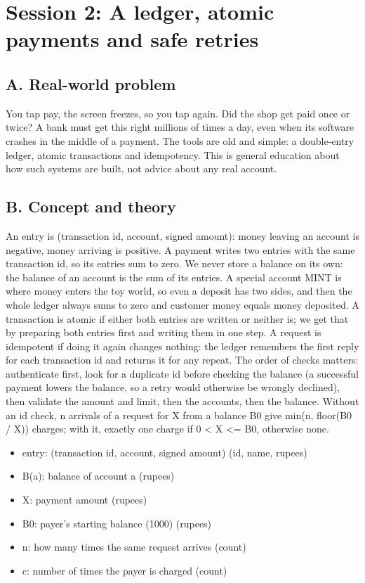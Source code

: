 \documentclass[11pt,a4paper]{article}
\begin{document}
\section{Session 2: A ledger, atomic payments and safe retries}

\subsection*{A. Real-world problem}
You tap pay, the screen freezes, so you tap again. Did the shop get paid once or twice? A bank must get this right millions of times a day, even when its software crashes in the middle of a payment. The tools are old and simple: a double-entry ledger, atomic transactions and idempotency. This is general education about how such systems are built, not advice about any real account.

\subsection*{B. Concept and theory}
An entry is (transaction id, account, signed amount): money leaving an account is negative, money arriving is positive. A payment writes two entries with the same transaction id, so its entries sum to zero. We never store a balance on its own: the balance of an account is the sum of its entries. A special account MINT is where money enters the toy world, so even a deposit has two sides, and then the whole ledger always sums to zero and customer money equals money deposited. A transaction is atomic if either both entries are written or neither is; we get that by preparing both entries first and writing them in one step. A request is idempotent if doing it again changes nothing: the ledger remembers the first reply for each transaction id and returns it for any repeat. The order of checks matters: authenticate first, look for a duplicate id before checking the balance (a successful payment lowers the balance, so a retry would otherwise be wrongly declined), then validate the amount and limit, then the accounts, then the balance. Without an id check, n arrivals of a request for X from a balance B0 give min(n, floor(B0 / X)) charges; with it, exactly one charge if 0 \textless{} X \textless{}= B0, otherwise none.

\begin{itemize}[nosep]
\item entry: (transaction id, account, signed amount) (id, name, rupees)
\item B(a): balance of account a (rupees)
\item X: payment amount (rupees)
\item B0: payer's starting balance (1000) (rupees)
\item n: how many times the same request arrives (count)
\item c: number of times the payer is charged (count)
\end{itemize}
\end{document}

